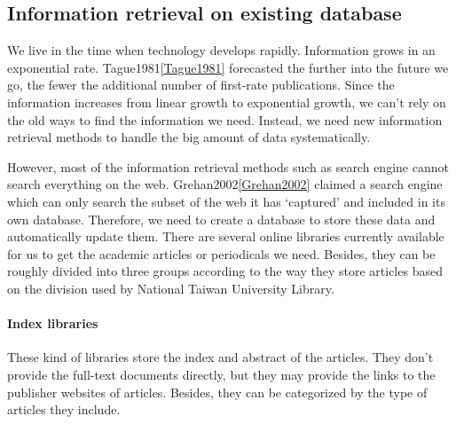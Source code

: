 	
\subsection{Information retrieval on existing database}
	We live in the time when technology develops rapidly. Information grows in an exponential rate. 
	Tague1981\ref{Tague1981} forecasted the further into the future we go, the fewer the additional number of first-rate publications. 
	Since the information increases from linear growth to exponential growth, we can't rely on the old ways to find the information we need. 
	Instead, we need new information retrieval methods to handle the big amount of data systematically. 
	
	However, most of the information retrieval methods such as search engine cannot search everything on the web. 
	Grehan2002\ref{Grehan2002} claimed a search engine which can only search the subset of the web it has ‘captured’ and included in its own database. 
	Therefore, we need to create a database to store these data and automatically update them.
	There are several online libraries currently available for us to get the academic articles or periodicals we need.
	Besides, they can be roughly divided into three groups according to the way they store articles based on the division used by National Taiwan University Library.

\paragraph{Index libraries}
	These kind of libraries store the index and abstract of the articles.
	They don't provide the full-text documents directly, but they may provide the links to the publisher websites of articles.
	Besides, they can be categorized by the type of articles they include.
	
